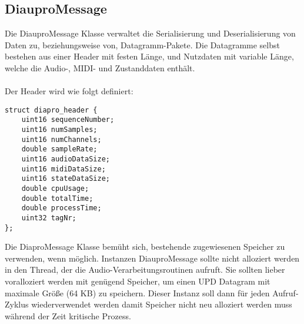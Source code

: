 \subsection{DiauproMessage}

Die DiauproMessage Klasse verwaltet die Serialisierung und Deserialisierung von Daten zu, beziehungsweise von, Datagramm-Pakete. Die Datagramme selbst bestehen aus einer Header mit festen Länge, und Nutzdaten mit variable Länge, welche die Audio-, MIDI- und Zustanddaten enthält.\\
\\
Der Header wird wie folgt definiert:

\begin{lstlisting}
struct diapro_header {
    uint16 sequenceNumber;
    uint16 numSamples;
    uint16 numChannels;
    double sampleRate;
    uint16 audioDataSize;
    uint16 midiDataSize;
    uint16 stateDataSize;
    double cpuUsage;
    double totalTime;
    double processTime;
    uint32 tagNr;
};
\end{lstlisting}

Die DiaproMessage Klasse bemüht sich, bestehende zugewiesenen Speicher zu verwenden, wenn möglich. Instanzen DiauproMessage sollte nicht alloziert werden in den Thread, der die Audio-Verarbeitungsroutinen aufruft. Sie sollten lieber voralloziert werden mit genügend Speicher, um einen UPD Datagram mit maximale Größe (64 KB) zu speichern. Dieser Instanz soll dann für jeden Aufruf-Zyklus wiederverwendet werden damit Speicher nicht neu alloziert werden muss während der Zeit kritische Prozess.
